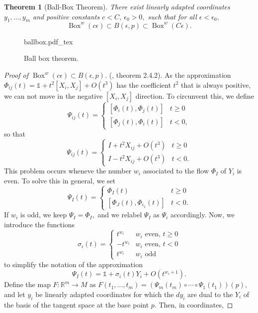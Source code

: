 \documentclass[12pt, letterpaper, reqno]{amsart}
\newcommand{\incfig}[2][1]{%
    \def\svgwidth{#1\columnwidth}
    {#2.pdf_tex}
}
\theoremstyle{definition}
\theoremstyle{plain}
\newtheorem{thm}{Theorem}
\theoremstyle{remark}
\begin{document}
\begin{thm}[Ball-Box Theorem]
	There exist linearly adapted coordinates $ y_1,\dots,y_m $ and positive constants $ c<C, \ \epsilon_0>0, $ such that for all $ \epsilon<\epsilon_0, $ 
	$$ \operatorname{Box}^w(c\epsilon)\subset B(\epsilon, p)\subset \operatorname{Box}^w(C\epsilon).    $$ 
\end{thm}
\begin{figure}[ht]
    \centering
    \incfig{ballbox}
    \caption{Ball box theorem.}
    \label{fig:ballbox}
\end{figure}
\begin{proof}[Proof of $\operatorname{Box}^w(c\epsilon)\subset B(\epsilon, p)$] (\cite{montgomery2002tour}, theorem 2.4.2). As the approximation $ \Phi_{ij}(t)= \mathbb{1} + t^2 \left[ X_i,X_j \right] + O(t^3)$ has the coefficient $ t^2 $ that is always positive, we can not move in the negative $ [X_i,X_j] $ direction. To circunvent this, we define 
	$$ \Psi_{i j}(t)=\left\{\begin{array}{ll}{\left[\Phi_{i}(t), \Phi_{j}(t)\right]} & t \geq 0 \\ {\left[\Phi_{j}(t), \Phi_{i}(t)\right]} & t<0,\end{array}\right. $$ 
	so that
	$$\Psi_{i j}(t)=\left\{\begin{array}{ll}I+t^{2} X_{i j}+O\left(t^{3}\right) & t \geq 0 \\ I-t^{2} X_{i j}+O\left(t^{3}\right) & t<0.\end{array}\right.$$
This problem occurs wheneve the number $ w_i $ associated to the flow $ \Phi_I $ of $ Y_i $ is even. To solve this in general, we set
$$\Psi_{I}(t)=\left\{\begin{array}{ll}
\Phi_{I}(t) & t \geq 0 \\
{\left[\Phi_{J}(t), \Phi_{i_{1}}(t)\right]} & t<0.
\end{array}\right.$$
If $ w_i $ is odd, we keep $ \Psi_I=\Phi_I, $ and we relabel $ \Psi_I $ as $ \Psi_i $ accordingly. Now, we introduce the functions
$$\sigma_{i}(t)=\left\{\begin{array}{ll}
t^{w_{i}} & w_{i} \text { even, } t \geq 0 \\
-t^{w_{i}} & w_{i} \text { even, } t<0 \\
t^{w_{i}} & w_{i} \text { odd }
\end{array}\right.
$$
to simplify the notation of the approximation
$$ \Psi_I(t)= \mathbb{1}+ \sigma_i(t) Y_i + O(t^{w_i+1}). $$ 
Define the map $ F: \mathbb{R}^m \rightarrow {M} $ as $ F(t_1,\dots,t_m) = \left( \Psi_m(t_m) \circ \cdots \circ \Psi_1(t_1)\right)(p), $ and let $ y_i $ be linearly adapted coordinates for which the $ dy_i $ are dual to the $ Y_i $ of the basis of the tangent space at the base point $ p. $ Then, in coordinates,


\end{proof}
\end{document}
